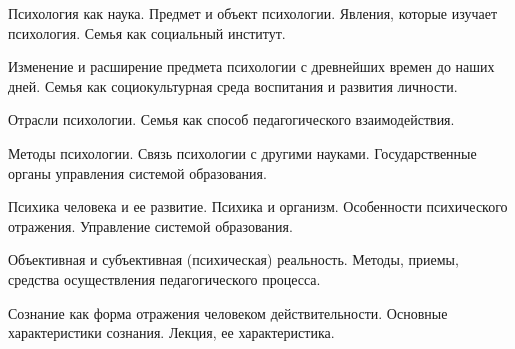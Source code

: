 \documentclass[
	14pt,
	a4paper,
	]
	{scrartcl}
\begin{document}
\shapk
{}
\setcounter{zad}{0}

\vfill
\z 	Психология как наука. Предмет и объект психологии. Явления, которые изучает психология.
 \vfill
\z 	Семья как социальный институт. \vfill

\vfill

\newpage


\shapk
{}
\setcounter{zad}{0}

\vfill
\z 	Изменение и расширение предмета психологии с древнейших времен до наших дней.
 \vfill
\z 	Семья как социокультурная среда воспитания и развития личности.
 \vfill

\vfill

\newpage


\shapk
{}
\setcounter{zad}{0}

\vfill
\z 	Отрасли психологии.
 \vfill
\z 	Семья как способ педагогического взаимодействия.
 \vfill

\vfill

\newpage


\shapk
{}
\setcounter{zad}{0}

\vfill
\z 	Методы психологии. Связь психологии с другими науками.
 \vfill
\z 	Государственные органы управления системой образования.
 \vfill

\vfill

\newpage


\shapk
{}
\setcounter{zad}{0}

\vfill
\z 	Психика человека и ее развитие. Психика и организм. Особенности психического отражения.
 \vfill
\z 	Управление системой образования.
 \vfill

\vfill

\newpage


\shapk
{}
\setcounter{zad}{0}

\vfill
\z 	Объективная и субъективная (психическая) реальность.
 \vfill
\z 	Методы, приемы, средства осуществления педагогического процесса.
 \vfill

\vfill

\newpage


\shapk
{}
\setcounter{zad}{0}

\vfill
\z 	Сознание как форма отражения человеком действительности. Основные характеристики сознания.
 \vfill
\z 	Лекция, ее характеристика.
 \vfill

\vfill
\end{document}
